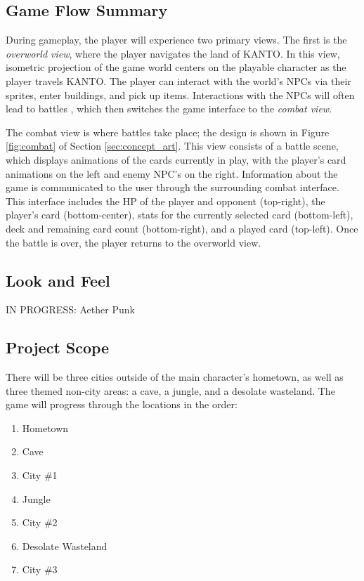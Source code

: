 \documentclass[12pt,titlepage]{article}
\newcommand\world{KANTO\xspace}
\begin{document}
\subsection{Game Flow Summary}

During gameplay, the player will experience two primary views. The first is the
{\it overworld view}, where the player navigates the land of \world. In this
view, isometric projection of the game world centers on the playable character
as the player travels \world. The player can interact with the world's NPCs via
their sprites, enter buildings, and pick up items. Interactions with the NPCs
will often lead to battles , which then switches the game interface to
the {\it combat view}.

The combat view is where battles take place; the design is shown in
Figure \ref{fig:combat} of Section \ref{sec:concept_art}. This view consists of
a battle scene, which displays animations of the cards currently in play, with
the player's card animations on the left and enemy NPC's on the right.
Information about the game is communicated to the user through the surrounding
combat interface. This interface includes the HP of the player and opponent
(top-right), the player's card (bottom-center), stats for the currently selected
card (bottom-left), deck and remaining card count (bottom-right), and a played
card (top-left). Once the battle is over, the player returns to the overworld
view.

\subsection{Look and Feel}
IN PROGRESS: Aether Punk

\subsection{Project Scope}
%

There will be three cities outside of the main character's hometown, as well as
three themed non-city areas: a cave, a jungle, and a desolate wasteland. The
game will progress through the locations in the order:

\begin{enumerate}
    \item Hometown
    \item Cave
    \item City \#1
    \item Jungle
    \item City \#2
    \item Desolate Wasteland
    \item City \#3
\end{enumerate}
\end{document}
